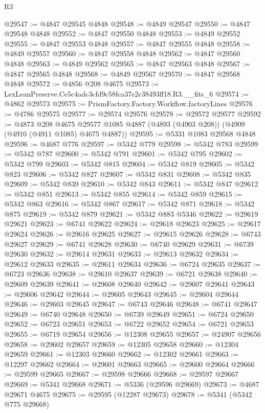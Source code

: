 \begin{lexlean}{R3}
\begin{coremodule}
@29547 := @4847 @29545 @4848
@29548 := @4849 @29547
@29550 := @4847 @29548 @4848
@29552 := @4847 @29550 @4848
@29553 := @4849 @29552
@29555 := @4847 @29553 @4848
@29557 := @4847 @29555 @4848
@29558 := @4849 @29557
@29560 := @4847 @29558 @4848
@29562 := @4847 @29560 @4848
@29563 := @4849 @29562
@29565 := @4847 @29563 @4848
@29567 := @4847 @29565 @4848
@29568 := @4849 @29567
@29570 := @4847 @29568 @4848
@29572 := @4856 @208 @4675
@29573 := LexLeanPreserve.Ce5c4adc3cfd9c58fca37e2c38493ff18.R3.__fits_6
@29574 := @4862 @29573
@29575 := PrismFactory.Factory.Workflow.factoryLines
@29576 := @4786 @29575
@29577 := @29574 @29576
@29578 := @29572 @29577
@29592 := @4873
    @208
    @4675
    @29577
    @1085
    @4887
    (@4893 (@4903 @208))
    (@4909 (@4910 (@4911 @1085) @4675 @4887))
@29595 := @5331 @1083 @29568 @4848
@29596 := @4687 @776
@29597 := @5342 @779
@29598 := @5342 @783
@29599 := @5342 @787
@29600 := @5342 @791
@29601 := @5342 @795
@29602 := @5342 @799
@29603 := @5342 @815
@29604 := @5342 @819
@29605 := @5342 @823
@29606 := @5342 @827
@29607 := @5342 @831
@29608 := @5342 @835
@29609 := @5342 @839
@29610 := @5342 @843
@29611 := @5342 @847
@29612 := @5342 @851
@29613 := @5342 @855
@29614 := @5342 @859
@29615 := @5342 @863
@29616 := @5342 @867
@29617 := @5342 @871
@29618 := @5342 @875
@29619 := @5342 @879
@29621 := @5342 @883 @5346
@29622 := @29619 @29621
@29623 := @6741 @29622
@29624 := @29618 @29623
@29625 := @29617 @29624
@29626 := @29616 @29625
@29627 := @29615 @29626
@29628 := @6743 @29627
@29629 := @6741 @29628
@29630 := @6740 @29629
@29631 := @6739 @29630
@29632 := @29614 @29631
@29633 := @29613 @29632
@29634 := @29612 @29633
@29635 := @29611 @29634
@29636 := @6724 @29635
@29637 := @6723 @29636
@29638 := @29610 @29637
@29639 := @6721 @29638
@29640 := @29609 @29639
@29641 := @29608 @29640
@29642 := @29607 @29641
@29643 := @29606 @29642
@29644 := @29605 @29643
@29645 := @29604 @29644
@29646 := @29603 @29645
@29647 := @6743 @29646
@29648 := @6741 @29647
@29649 := @6740 @29648
@29650 := @6739 @29649
@29651 := @6724 @29650
@29652 := @6723 @29651
@29653 := @6722 @29652
@29654 := @6721 @29653
@29655 := @6719 @29654
@29656 := @12308 @29655
@29657 := @24907 @29656
@29658 := @29602 @29657
@29659 := @12305 @29658
@29660 := @12304 @29659
@29661 := @12303 @29660
@29662 := @12302 @29661
@29663 := @12297 @29662
@29664 := @29601 @29663
@29665 := @29600 @29664
@29666 := @29599 @29665
@29667 := @29598 @29666
@29668 := @29597 @29667
@29669 := @5341 @29668
@29671 := @5336 (@29596 @29669)
@29673 := @4687 @29671 @4675
@29675 := @29595 (@12287 @29673)
@29678 := @5341 (@5342 @775 @29668)

\end{coremodule}
\end{lexlean}
